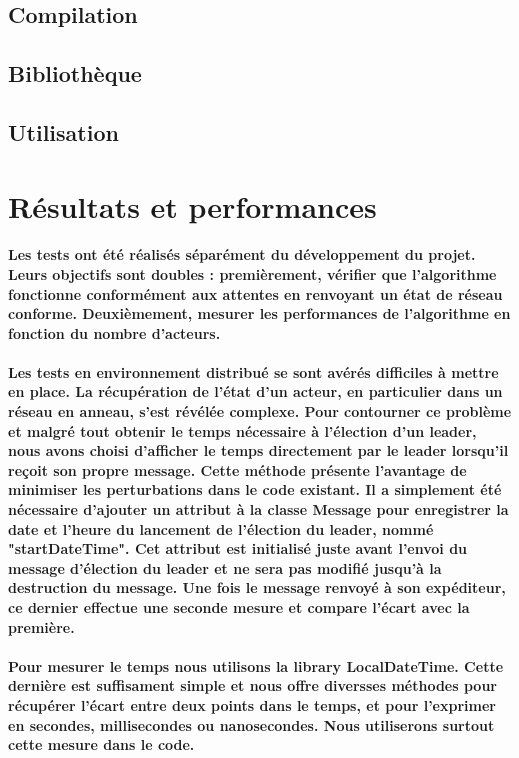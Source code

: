 \documentclass[12pt]{article}
\begin{document}
\subsection{Compilation}

\subsection{Bibliothèque}

\subsection{Utilisation}
\section{Résultats et performances}

\paragraph{Les tests ont été réalisés séparément du développement du projet. Leurs objectifs sont doubles : premièrement, vérifier que l'algorithme fonctionne conformément aux attentes en renvoyant un état de réseau conforme. Deuxièmement, mesurer les performances de l'algorithme en fonction du nombre d'acteurs.}
\paragraph{Les tests en environnement distribué se sont avérés difficiles à mettre en place. La récupération de l'état d'un acteur, en particulier dans un réseau en anneau, s'est révélée complexe. Pour contourner ce problème et malgré tout obtenir le temps nécessaire à l'élection d'un leader, nous avons choisi d'afficher le temps directement par le leader lorsqu'il reçoit son propre message. Cette méthode présente l'avantage de minimiser les perturbations dans le code existant. Il a simplement été nécessaire d'ajouter un attribut à la classe Message pour enregistrer la date et l'heure du lancement de l'élection du leader, nommé "startDateTime". Cet attribut est initialisé juste avant l'envoi du message d'élection du leader et ne sera pas modifié jusqu'à la destruction du message. Une fois le message renvoyé à son expéditeur, ce dernier effectue une seconde mesure et compare l'écart avec la première.}
\paragraph{Pour mesurer le temps nous utilisons la library LocalDateTime. Cette dernière est suffisament simple et nous offre diversses méthodes pour récupérer l'écart entre deux points dans le temps, et pour l'exprimer en secondes, millisecondes ou nanosecondes. Nous utiliserons surtout cette mesure dans le code.}
\end{document}
